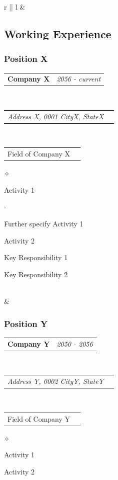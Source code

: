 \documentclass[a4paper]{article}
\makeatletter
\newlength{\sectsep}
\newlength{\subsectsep}
\newcommand{\headerrow}[2]
{\begin{tabular*}{\textwidth}{l@{\extracolsep{\fill}}r}
	#1 &
	#2 \\
\end{tabular*}}
\renewenvironment{itemize}{
  \begin{list}{$\diamond$}{
    \setlength{\topsep}{0.25em}
    \setlength{\itemsep}{0em}
    \setlength{\parskip}{0pt}
    \setlength{\parsep}{0em}
  }
}{
  \end{list}
}
\newenvironment{itemize2}{
  \begin{list}{$\cdot$}{
    \setlength{\topsep}{0.25em}
    \setlength{\itemsep}{0em}
    \setlength{\parskip}{0pt}
    \setlength{\parsep}{0em}
  }
}{
  \end{list}
}
\makeatother
\begin{document}
\begin{longtable}{r || l}
  & \begin{minipage}{0.9\textwidth}
      \vspace{\sectsep}
      \subsection*{Working Experience}
      \subsubsection*{Position X}
      \headerrow
  		{\textbf{Company X}}{\emph{2056 - current}}
      \\
      \headerrow
        {\emph{Address X, 0001 CityX, StateX}}{}
      \\
      \headerrow
        {Field of Company X}{}

      \begin{itemize}
          \item Activity 1
          \begin{itemize2}
              \item Further specify Activity 1
          \end{itemize2}
          \item Activity 2
          \item Key Responsibility 1
          \item Key Responsibility 2
      \end{itemize}
  \end{minipage} \\[\sectsep]

  & \begin{minipage}{0.9\textwidth}
      \vspace{\subsectsep}
      \subsubsection*{Position Y}
      \headerrow
  		{\textbf{Company Y}}{\emph{2050 - 2056}}
      \\
      \headerrow
        {\emph{Address Y, 0002 CityY, StateY}}{}
      \\
      \headerrow
          {Field of Company Y}{}

      \begin{itemize}
          \item Activity 1
          \item Activity 2
      \end{itemize}
  \end{minipage} \\[\sectsep]


\end{longtable}
\end{document}

